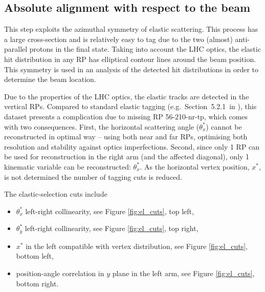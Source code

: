 \documentclass[TOTEM]{cern/cernphprep}
\begin{document}
\subsection{Absolute alignment with respect to the beam}
\label{s:calib-elastic}

This step exploits the azimuthal symmetry of elastic scattering. This process has a large cross-section and is relatively easy to tag due to the two (almost) anti-parallel protons in the final state. Taking into account the LHC optics, the elastic hit distribution in any RP has elliptical contour lines around the beam position. This symmetry is used in an analysis of the detected hit distributions in order to determine the beam location.

Due to the properties of the LHC optics, the elastic tracks are detected in the vertical RPs. Compared to standard elastic tagging (e.g.~Section~5.2.1~in \cite{totem-8tev-90m}), this dataset presents a complication due to missing RP 56-210-nr-tp, which comes with two consequences. First, the horizontal scattering angle ($\theta_x^*$) cannot be reconstructed in optimal way -- using both near and far RPs, optimising both resolution and stability against optics imperfections. Second, since only 1 RP can be used for reconstruction in the right arm (and the affected diagonal), only 1 kinematic variable can be reconstructed: $\theta_x^*$. As the horizontal vertex position, $x^*$, is not determined the number of tagging cuts is reduced.

The elastic-selection cuts include
\begin{itemize}[nosep]
\item $\theta_x^*$ left-right collinearity, see Figure \ref{fig:el_cuts}, top left,
\item $\theta_y^*$ left-right collinearity, see Figure \ref{fig:el_cuts}, top right,
\item $x^*$ in the left compatible with vertex distribution, see Figure \ref{fig:el_cuts}, bottom left,
\item position-angle correlation in $y$ plane in the left arm, see Figure \ref{fig:el_cuts}, bottom right.
\end{itemize}
\end{document}
